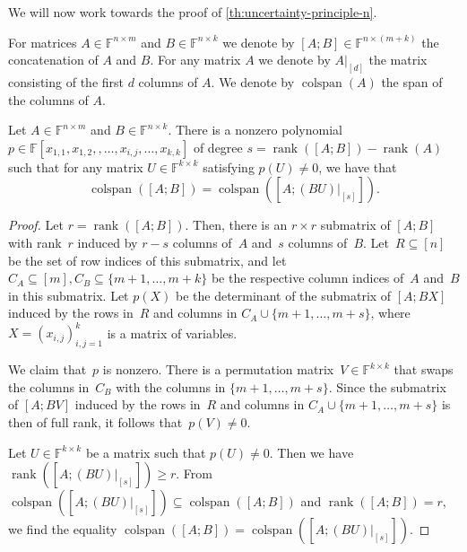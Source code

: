 \documentclass{daj}
\newcommand{\FF}{\mathbb{F}}
\DeclareMathOperator{\rank}{rank} \DeclareMathOperator{\col}{colspan}
\begin{document}
%
%
%
%
%


%
%
%
%
%
%
%
%
%

%
%

%

%
We will now work towards the proof of \autoref{th:uncertainty-principle-n}.

For matrices $A \in \FF^{n\times m}$ and $B \in \FF^{n \times k}$ we denote by $[A; B] \in \FF^{n \times (m+k)}$ the concatenation of $A$ and $B$. For any matrix $A$ we denote by $A|_{[d]}$ the matrix consisting of the first $d$ columns of $A$. We denote by $\col(A)$ the span of the columns of $A$.

\begin{lemma}\label{lem:colspan}
    Let $A \in \FF^{n\times m}$ and $B \in \FF^{n \times k}$. There is a nonzero %
    polynomial $p\in \FF[x_{1,1},x_{1,2},,\ldots,x_{i,j},\dots,x_{k,k}]$ of degree $s = \rank([A;B]) - \rank(A)$ such that for any matrix $U \in \FF^{k\times k}$ satisfying $p(U)\neq 0$, we have that
    \[
    \col([A;B]) = \col([A; (BU)|_{[s]}]).
    \]
\end{lemma}
\begin{proof}
    Let $r = \rank([A;B])$. Then, there is an $r\times r$ submatrix of $[A;B]$ with rank~$r$ induced by $r-s$ columns of~$A$ and~$s$ columns of~$B$.
    Let~$R\subseteq [n]$ be the set of row indices of this submatrix, and let $C_A\subseteq[m], C_B\subseteq \{m+1,\dots,m+k\}$ be the respective column indices of~$A$ and~$B$ in this submatrix.
    Let $p(X)$ be the determinant of the submatrix of $[A;BX]$ induced by the rows in~$R$ and columns in $C_A\cup \{m+1,\dots,m+s\}$, where $X = (x_{i,j})_{i,j=1}^k$ is a matrix of variables.
    
    We claim that~$p$ is nonzero. There is a permutation matrix~$V\in \FF^{k \times k}$ that swaps the columns in~$C_B$ with the columns in $\{m+1,\dots, m+s\}$. Since the submatrix of $[A;BV]$ induced by the rows in~$R$ and columns in $C_A\cup \{m+1,\dots,m+s\}$ is then of full rank, it follows that~$p(V)\ne 0$. 
        
    Let $U \in \FF^{k \times k}$ be a matrix such that $p(U) \neq 0$. 
    Then we have $\rank([A; (BU)|_{[s]}]) \geq r$. From $\col([A; (BU)|_{[s]}])\subseteq \col([A;B])$ and $\rank([A;B]) = r$, we find the equality $\col([A;B]) = \col([A; (BU)|_{[s]}])$.
\end{proof}
\end{document}
